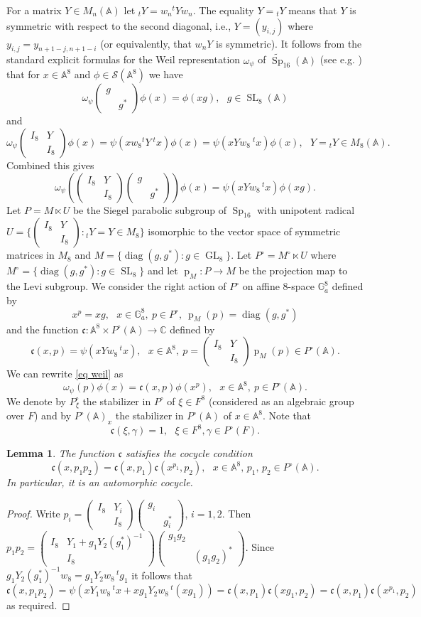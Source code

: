 \documentclass[12pt]{amsart}
\newcommand{\GL}{\operatorname{GL}}
\newcommand{\SL}{\operatorname{SL}}
\newcommand{\Sp}{\operatorname{Sp}}
\newcommand{\swrz}{\mathcal{S}}
\newcommand{\A}{\mathbb{A}}
\newcommand{\C}{\mathbb{C}}
\newcommand{\diag}{\operatorname{diag}}
\newcommand{\proj}{\operatorname{p}}
\newcommand{\sm}[4]{\left(\begin{smallmatrix}{#1}&{#2}\\{#3}&{#4}\end{smallmatrix}\right)}
\renewcommand{\c}{\mathfrak{c}}
\newtheorem{lemma}[theorem]{Lemma}
\theoremstyle{remark}
\begin{document}
For a matrix $Y\in M_n(\A)$ let ${}_tY=w_n {}^tY w_n$. The equality $Y={}_tY$ means that $Y$ is symmetric with respect to the second diagonal, i.e., $Y=(y_{i,j})$ where $y_{i,j}=y_{n+1-j,n+1-i}$ (or equivalently, that $w_n Y$ is symmetric).
It follows from the standard explicit formulas for the Weil representation $\omega_\psi$ of $\widetilde{\Sp}_{16}(\A)$ (see e.g. \cite{MR2848523}) that for $x\in \A^8$ and $\phi\in \swrz(\A^8)$ we have
\[
\omega_\psi\sm{g}{}{}{g^*} \phi(x)=\phi(xg), \ \ \ g\in \SL_8(\A)\]
and
\[
\omega_\psi\sm{I_8}{Y}{}{I_8}\phi(x)=\psi(xw_8 {}^tY\ {}^t x)\phi(x)=\psi(xYw_8\ {}^t x)\phi(x),\ \ \ Y={}_t Y\in M_8(\A). 
\]
Combined this gives
\begin{equation}\label{eq weil}
\omega_\psi(\sm{I_8}{Y}{}{I_8} \sm{g}{}{}{g^*})\phi(x)=\psi(x  Yw_8\,  {}^t x)\phi(xg).
\end{equation}
Let $P=M\ltimes U$ be the Siegel parabolic subgroup of $\Sp_{16}$ with unipotent radical $U=\{\sm{I_8}{Y}{}{I_8}: {}_tY=Y\in M_8\}$ isomorphic to the vector space of symmetric matrices in $M_8$ and $M=\{\diag(g,g^*):g\in \GL_8\}$. Let $P^\circ=M^\circ \ltimes U$ where $M^\circ= \{\diag(g,g^*):g\in \SL_8\}$ and let $\proj_M:P\rightarrow M$ be the projection map to the Levi subgroup. 
We consider the right action of $P^\circ$ on affine $8$-space $\mathbb{G}_a^8$ defined by
\[
x^p=xg, \ \ \ x\in \mathbb{G}_a^8,\ p\in P^\circ,\ \proj_M(p)=\diag(g,g^*)
\]
and the function $\c:\A^8 \times P^\circ(\A)\rightarrow \C$ defined by
\[
\c(x,p)=\psi(xYw_8 \,{}^t x), \ \ \ x\in \A^8,\ p=\sm{I_8}{Y}{}{I_8}\proj_M(p)\in P^\circ(\A).
\]
We can rewrite \eqref{eq weil} as
\begin{equation}\label{eq weil cocycle form}
\omega_\psi(p)\phi(x)=\c(x,p)\phi(x^p), \ \ \ x\in \A^8,\ p\in P^\circ(\A).
\end{equation}
We denote by $P^\circ_\xi$ the stabilizer in $P^\circ$ of $\xi\in F^8$ (considered as an algebraic group over $F$) and by $P^\circ(\A)_x$ the stabilizer in $P^\circ(\A)$ of $x\in \A^8$. Note that
\[
\c(\xi,\gamma)=1, \ \ \ \xi\in F^8, \gamma\in P^\circ(F).
\]




\begin{lemma}\label{lem cocyc}
The function $\c$ satisfies the cocycle condition
\[
\c(x,p_1p_2)=\c(x,p_1)\c(x^{p_1},p_2),\ \ \ x\in \A^8,\,p_1,\,p_2\in P^\circ(\A).
\]
In particular, it is an automorphic cocycle. 
\end{lemma}
\begin{proof}
Write $p_i=\sm{I_8}{Y_i}{}{I_8} \sm{g_i}{}{}{g_i^*}$, $i=1,2$. Then $p_1p_2=\sm{I_8}{Y_1+g_1Y_2(g_1^*)^{-1}}{}{I_8} \sm{g_1g_2}{}{}{(g_1g_2)^*}$. Since $g_1Y_2(g_1^*)^{-1}w_8=g_1Y_2 w_8\,{}^t g_1$ it follows that 
\[
\c(x,p_1p_2)=\psi(x Y_1 w_8 \,{}^t x+ xg_1 Y_2w_8 \, {}^t (x g_1))=\c(x,p_1)\c(x g_1,p_2)=\c(x,p_1)\c(x^{p_1},p_2)
\] 
as required. 
\end{proof}
\end{document}
